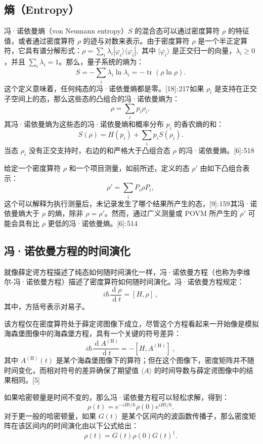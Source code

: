 \subsection{熵（Entropy）}
冯·诺依曼熵（von Neumann entropy）\( S \) 的混合态可以通过密度算符 \(\rho\) 的特征值，或者通过密度算符 \(\rho\) 的迹与对数来表示。由于密度算符 \(\rho\) 是一个半正定算符，它具有谱分解形式：\(\rho = \sum_i \lambda_i |\varphi_i \rangle \langle \varphi_i|,\)
其中 \(|\varphi_i\rangle\) 是正交归一的向量，\(\lambda_i \geq 0\)，并且 \(\sum_i \lambda_i = 1\)。那么，量子系统的熵为：
\[
S = - \sum_i \lambda_i \ln \lambda_i = - \operatorname{tr}(\rho \ln \rho).~
\]
这个定义意味着，任何纯态的冯·诺依曼熵都是零。[18]: 217 如果 \(\rho_i\) 是支持在正交子空间上的态，那么这些态的凸组合的冯·诺依曼熵为：
\[
\rho = \sum_i p_i \rho_i,~
\]
其冯·诺依曼熵为这些态的冯·诺依曼熵和概率分布 \( p_i \) 的香农熵的和：
\[
S(\rho) = H(p_i) + \sum_i p_i S(\rho_i).~
\]
当态 \(\rho_i\) 没有正交支持时，右边的和严格大于凸组合态 \(\rho\) 的冯·诺依曼熵。[6]: 518 

给定一个密度算符 \(\rho\) 和一个项目测量，如前所述，定义的态 \(\rho'\) 由如下凸组合表示：
\[
\rho' = \sum_i P_i \rho P_i,~
\]
这个可以解释为执行测量后，未记录发生了哪个结果所产生的态，[9]: 159 其冯·诺依曼熵大于 \(\rho\) 的熵，除非 \(\rho = \rho'\)。然而，通过广义测量或 POVM 所产生的 \(\rho'\) 可能会具有比 \(\rho\) 更低的冯·诺依曼熵。[6]: 514 
\subsection{冯·诺依曼方程的时间演化}
就像薛定谔方程描述了纯态如何随时间演化一样，冯·诺依曼方程（也称为李维尔-冯·诺依曼方程）描述了密度算符如何随时间演化。冯·诺依曼方程规定：
\[
i\hbar \frac{\operatorname{d} \rho}{\operatorname{d} t} = [H, \rho]~,~
\]
其中，方括号表示对易子。

该方程仅在密度算符处于薛定谔图像下成立，尽管这个方程看起来一开始像是模拟海森堡图像中的海森堡方程，具有一个关键的符号差异：
\[
i\hbar \frac{\operatorname{d} A^{(\mathrm{H})}}{\operatorname{d} t} = -[H, A^{(\mathrm{H})}]~,~
\]
其中 \( A^{(\mathrm{H})}(t) \) 是某个海森堡图像下的算符；但在这个图像下，密度矩阵并不随时间变化，而相对符号的差异确保了期望值 \( \langle A \rangle \) 的时间导数与薛定谔图像中的结果相同。[5]

如果哈密顿量是时间不变的，那么冯·诺依曼方程可以轻松求解，得到：
\[
\rho(t) = e^{-iHt/\hbar} \rho(0) e^{iHt/\hbar}.~
\]
对于更一般的哈密顿量，如果 \( G(t) \) 是某个区间内的波函数传播子，那么密度矩阵在该区间内的时间演化由以下公式给出：
\[
\rho(t) = G(t) \rho(0) G(t)^{\dagger}.~
\]

